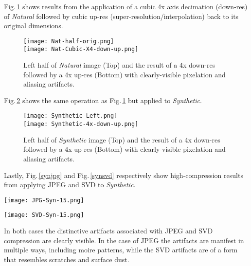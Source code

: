 \documentclass{article}
\begin{document}
Fig.\,\ref{natres} shows results from the application of a cubic 4x axis decimation (down-res)
of {\em Natural} followed by cubic up-res (super-resolution/interpolation) back to its 
original dimensions. 
\begin{figure}
   \centering
   \texttt{[image: Nat-half-orig.png]}\\ \vspace{3pt}
   \texttt{[image: Nat-Cubic-X4-down-up.png]}
\caption{Left half of {\em Natural} image (Top) and the result of a 4x down-res 
followed by a 4x up-res (Bottom) with clearly-visible pixelation and aliasing artifacts.}
\label{natres}
\end{figure}

Fig.\,\ref{synres} shows the same operation as Fig.\,\ref{natres} but applied to {\em Synthetic}.
\begin{figure}
   \centering
   \texttt{[image: Synthetic-Left.png]}\\ \vspace{3pt}
   \texttt{[image: Synthetic-4x-down-up.png]}
\caption{Left half of {\em Synthetic} image (Top) and the result of a 4x down-res 
followed by a 4x up-res (Bottom) with clearly-visible pixelation and aliasing artifacts.}
\label{synres}
\end{figure} 

Lastly, Fig.\,\ref{synjpg} and Fig.\,\ref{synsvd} respectively show high-compression results from applying
JPEG and SVD to {\em Synthetic}.
\begin{figure*}
   \centering
   \texttt{[image: JPG-Syn-15.png]}
\caption{JPEG high-compression of {\em Synthetic}.}
\label{synjpg}
\end{figure*} 
\begin{figure*}
   \centering
   \texttt{[image: SVD-Syn-15.png]}
\caption{SVD high-compression of {\em Synthetic}.}
\label{synsvd}
\end{figure*}
In both cases the distinctive artifacts associated with JPEG and SVD 
compression are clearly visible. In the case of JPEG the artifacts
are manifest in multiple ways, including moire patterns, while the
SVD artifacts are of a form that resembles scratches and surface
dust. 
\end{document}
